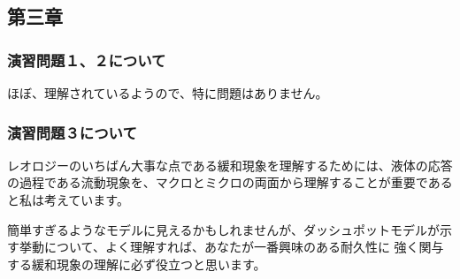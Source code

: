 \documentclass[uplatex,dvipdfmx,a4paper,11pt]{jsreport}
\begin{document}
\subsection*{第三章}
\subsubsection*{演習問題１、２について}
ほぼ、理解されているようので、特に問題はありません。

\subsubsection*{演習問題３について}

レオロジーのいちばん大事な点である緩和現象を理解するためには、液体の応答の過程である流動現象を、マクロとミクロの両面から理解することが重要であると私は考えています。

簡単すぎるようなモデルに見えるかもしれませんが、ダッシュポットモデルが示す挙動について、よく理解すれば、あなたが一番興味のある耐久性に
強く関与する緩和現象の理解に必ず役立つと思います。

\clearpage
\end{document}

